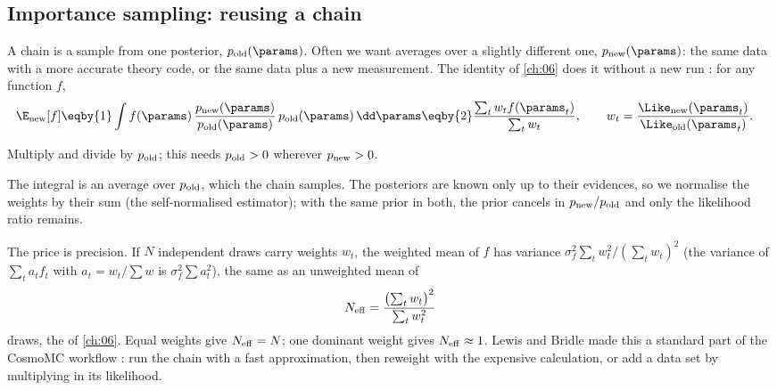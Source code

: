 \subsection{Importance sampling: reusing a chain}
\label{9c:sec:importance}

A chain is a sample from one posterior, $p_{\rm old}(\params)$. Often we want averages over a slightly different one,
$p_{\rm new}(\params)$: the same data with a more accurate theory code, or the same data plus a new measurement. The
identity of \cref{ch:06} does it without a new run : for any function $f$,
\begin{align}
  \E_{\rm new}[f]
  &\eqby{1}\int f(\params)\,\frac{p_{\rm new}(\params)}{p_{\rm old}(\params)}\,p_{\rm old}(\params)\,\dd\params
   \eqby{2}\frac{\sum_tw_tf(\params_t)}{\sum_tw_t},
  \qquad
  w_t=\frac{\Like_{\rm new}(\params_t)}{\Like_{\rm old}(\params_t)} .
  \label{9c:eq:is}
\end{align}
\begin{explain}
  \item Multiply and divide by $p_{\rm old}$; this needs $p_{\rm old}>0$ wherever $p_{\rm new}>0$.
  \item The integral is an average over $p_{\rm old}$, which the chain samples. The posteriors are known only up to their
        evidences, so we normalise the weights by their sum (the self-normalised estimator); with the same prior in
        both, the prior cancels in $p_{\rm new}/p_{\rm old}$ and only the likelihood ratio remains.
\end{explain}
The price is precision. If $N$ independent draws carry weights $w_t$, the weighted mean of $f$ has variance
$\sigma_f^2\sum_tw_t^2/(\sum_tw_t)^2$ (the variance of $\sum_ta_tf_t$ with $a_t=w_t/\sum w$ is $\sigma_f^2\sum a_t^2$), the
same as an unweighted mean of
\begin{equation}
  N_{\rm eff}=\frac{\bigl(\sum_tw_t\bigr)^2}{\sum_tw_t^2}
  \label{9c:eq:kish}
\end{equation}
draws, the  of \cref{ch:06}. Equal weights give $N_{\rm eff}=N$; one dominant weight gives
$N_{\rm eff}\approx1$. Lewis and Bridle made this a standard part of the CosmoMC workflow \cite{LewisBridle2002}: run the
chain with a fast approximation, then reweight with the expensive calculation, or add a data set by multiplying in its
likelihood.

